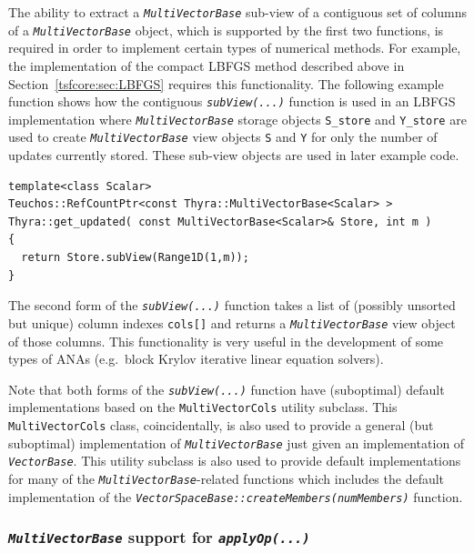 \documentclass[pdf,ps2pdf,11pt]{SANDreport}
\begin{document}
{}\noindent{}The ability to extract a {}\texttt{\textit{Multi\-Vector\-Base}}
sub-view of a contiguous set of columns of a
{}\texttt{\textit{Multi\-Vector\-Base}} object, which is supported by the
first two functions, is required in order to implement certain types of
numerical methods.  For example, the implementation of the compact LBFGS
method described above in Section~\ref{tsfcore:sec:LBFGS} requires this
functionality.  The following example function shows how the contiguous
{}\texttt{\textit{subView(...)}} function is used in an LBFGS implementation
where {}\texttt{\textit{Multi\-Vector\-Base}} storage objects
{}\texttt{S\_store} and {}\texttt{Y\_store} are used to create
{}\texttt{\textit{Multi\-Vector\-Base}} view objects {}\texttt{S} and
{}\texttt{Y} for only the number of updates currently stored.  These sub-view
objects are used in later example code.

{\scriptsize\begin{verbatim}
template<class Scalar>
Teuchos::RefCountPtr<const Thyra::MultiVectorBase<Scalar> >
Thyra::get_updated( const MultiVectorBase<Scalar>& Store, int m )
{
  return Store.subView(Range1D(1,m));
}
\end{verbatim}}

The second form of the {}\texttt{\textit{subView(...)}} function takes a
list of (possibly unsorted but unique) column indexes
{}\texttt{cols[]} and returns a {}\texttt{\textit{Multi\-Vector\-Base}} view
object of those columns.  This functionality is very useful in the
development of some types of ANAs (e.g.~block Krylov iterative linear
equation solvers).

Note that both forms of the {}\texttt{\textit{subView(...)}} function
have (suboptimal) default implementations based on the
{}\texttt{MultiVectorCols} utility subclass.  This
{}\texttt{MultiVectorCols} class, coincidentally, is also used to
provide a general (but suboptimal) implementation of
{}\texttt{\textit{Multi\-Vector\-Base}} just given an implementation of
{}\texttt{\textit{Vector\-Base}}.  This utility subclass is also used to
provide default implementations for many of the
{}\texttt{\textit{Multi\-Vector\-Base}}-related functions which includes the
default implementation of the
{}\texttt{\textit{Vector\-Space\-Base\-::createMembers(numMembers)}} function.

%
\subsubsection{\texttt{\textit{Multi\-Vector\-Base}} support for {}\texttt{\textit{applyOp(\-...)}}}
\label{tsfcore:sec:multi_vec_apply_op}
%
\end{document}
